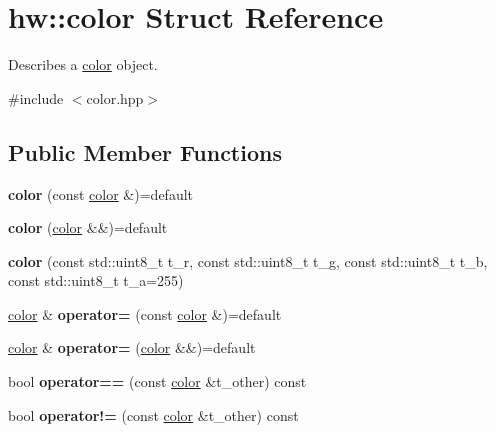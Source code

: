 \hypertarget{structhw_1_1color}{}\section{hw\+:\+:color Struct Reference}
\label{structhw_1_1color}


Describes a \mbox{\hyperlink{structhw_1_1color}{color}} object.  




{\ttfamily \#include $<$color.\+hpp$>$}

\subsection*{Public Member Functions}
\begin{DoxyCompactItemize}
\item 
\mbox{\label{structhw_1_1color_a049322a530be440e16f4ec823efbc1d6}} 
{\bfseries color} (const \mbox{\hyperlink{structhw_1_1color}{color}} \&)=default
\item 
\mbox{\label{structhw_1_1color_ae23c3ffc2737b572e3019aaecfa87cf4}} 
{\bfseries color} (\mbox{\hyperlink{structhw_1_1color}{color}} \&\&)=default
\item 
\mbox{\label{structhw_1_1color_a68f0693ae5596751081d7bf64bca3951}} 
{\bfseries color} (const std\+::uint8\+\_\+t t\+\_\+r, const std\+::uint8\+\_\+t t\+\_\+g, const std\+::uint8\+\_\+t t\+\_\+b, const std\+::uint8\+\_\+t t\+\_\+a=255)
\item 
\mbox{\label{structhw_1_1color_aeceb94242f19d716ef64f3481eedb929}} 
\mbox{\hyperlink{structhw_1_1color}{color}} \& {\bfseries operator=} (const \mbox{\hyperlink{structhw_1_1color}{color}} \&)=default
\item 
\mbox{\label{structhw_1_1color_aca4648201fc9783fa47376887983bd4f}} 
\mbox{\hyperlink{structhw_1_1color}{color}} \& {\bfseries operator=} (\mbox{\hyperlink{structhw_1_1color}{color}} \&\&)=default
\item 
\mbox{\label{structhw_1_1color_ac8f2a9b9a800947f3acd8381387de2dd}} 
bool {\bfseries operator==} (const \mbox{\hyperlink{structhw_1_1color}{color}} \&t\+\_\+other) const
\item 
\mbox{\label{structhw_1_1color_a975bddf84481bbbdf6064a23260f91d7}} 
bool {\bfseries operator!=} (const \mbox{\hyperlink{structhw_1_1color}{color}} \&t\+\_\+other) const
\end{DoxyCompactItemize}
